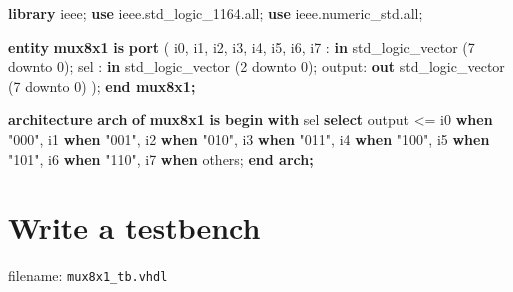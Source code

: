 \documentclass[11pt]{article}
\newenvironment{Shaded}{}{}
\newcommand{\KeywordTok}[1]{\textcolor[rgb]{0.00,0.44,0.13}{\textbf{{#1}}}}
\newcommand{\DataTypeTok}[1]{\textcolor[rgb]{0.56,0.13,0.00}{{#1}}}
\newcommand{\DecValTok}[1]{\textcolor[rgb]{0.25,0.63,0.44}{{#1}}}
\newcommand{\StringTok}[1]{\textcolor[rgb]{0.25,0.44,0.63}{{#1}}}
\newcommand{\OtherTok}[1]{\textcolor[rgb]{0.00,0.44,0.13}{{#1}}}
\newcommand{\ErrorTok}[1]{\textcolor[rgb]{1.00,0.00,0.00}{\textbf{{#1}}}}
\newcommand{\NormalTok}[1]{{#1}}
\begin{document}
\begin{Shaded}
\begin{Highlighting}[]
\KeywordTok{library}\NormalTok{ ieee;}
\KeywordTok{use}\NormalTok{ ieee}\OtherTok{.}\NormalTok{std\_logic\_1164}\OtherTok{.}\NormalTok{all;}
\KeywordTok{use}\NormalTok{ ieee}\OtherTok{.}\NormalTok{numeric\_std}\OtherTok{.}\NormalTok{all;}

\KeywordTok{entity} \KeywordTok{mux8x1} \KeywordTok{is}
    \KeywordTok{port}\NormalTok{ (}
\NormalTok{        i0}\OtherTok{,}
\NormalTok{        i1}\OtherTok{,}
\NormalTok{        i2}\OtherTok{,}
\NormalTok{        i3}\OtherTok{,}
\NormalTok{        i4}\OtherTok{,}
\NormalTok{        i5}\OtherTok{,}
\NormalTok{        i6}\OtherTok{,}
\NormalTok{        i7    }\OtherTok{:} \KeywordTok{in} \DataTypeTok{std\_logic\_vector}\NormalTok{ (}\DecValTok{7} \OtherTok{downto} \DecValTok{0}\NormalTok{);}
\NormalTok{        sel   }\OtherTok{:} \KeywordTok{in} \DataTypeTok{std\_logic\_vector}\NormalTok{ (}\DecValTok{2} \OtherTok{downto} \DecValTok{0}\NormalTok{);}
\NormalTok{        output}\OtherTok{:} \KeywordTok{out} \DataTypeTok{std\_logic\_vector}\NormalTok{ (}\DecValTok{7} \OtherTok{downto} \DecValTok{0}\NormalTok{)}
\NormalTok{    );}
\KeywordTok{end mux8x1;}

\KeywordTok{architecture} \KeywordTok{arch} \KeywordTok{of} \KeywordTok{mux8x1} \KeywordTok{is}
\KeywordTok{begin}
    \KeywordTok{with}\NormalTok{ sel }\KeywordTok{select}\NormalTok{ output }\OtherTok{\textless{}=}
\NormalTok{        i0 }\KeywordTok{when} \StringTok{"000"}\OtherTok{,}
\NormalTok{        i1 }\KeywordTok{when} \StringTok{"001"}\OtherTok{,}
\NormalTok{        i2 }\KeywordTok{when} \StringTok{"010"}\OtherTok{,}
\NormalTok{        i3 }\KeywordTok{when} \StringTok{"011"}\OtherTok{,}
\NormalTok{        i4 }\KeywordTok{when} \StringTok{"100"}\OtherTok{,}
\NormalTok{        i5 }\KeywordTok{when} \StringTok{"101"}\OtherTok{,}
\NormalTok{        i6 }\KeywordTok{when} \StringTok{"110"}\OtherTok{,}
\NormalTok{        i7 }\KeywordTok{when} \OtherTok{others}\NormalTok{;}
\ErrorTok{end arch;}
\end{Highlighting}
\end{Shaded}

    \hypertarget{write-a-testbench}{%
\section{Write a testbench}\label{write-a-testbench}}

filename: \texttt{mux8x1\_tb.vhdl}
\end{document}
